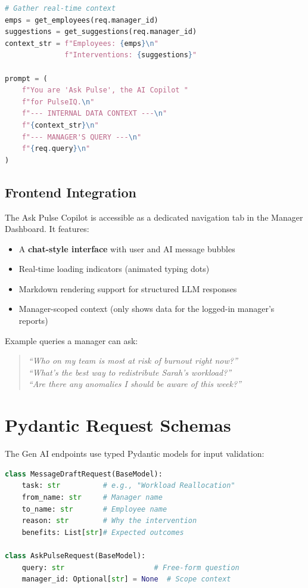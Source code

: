 \documentclass[12pt, a4paper, oneside]{report}
\begin{document}
\begin{lstlisting}[language=Python, caption={Ask Pulse RAG-style prompt}]
# Gather real-time context
emps = get_employees(req.manager_id)
suggestions = get_suggestions(req.manager_id)
context_str = f"Employees: {emps}\n"
              f"Interventions: {suggestions}"

prompt = (
    f"You are 'Ask Pulse', the AI Copilot "
    f"for PulseIQ.\n"
    f"--- INTERNAL DATA CONTEXT ---\n"
    f"{context_str}\n"
    f"--- MANAGER'S QUERY ---\n"
    f"{req.query}\n"
)
\end{lstlisting}

\subsection{Frontend Integration}

The Ask Pulse Copilot is accessible as a dedicated navigation tab in the Manager Dashboard. It features:

\begin{itemize}
    \item A \textbf{chat-style interface} with user and AI message bubbles
    \item Real-time loading indicators (animated typing dots)
    \item Markdown rendering support for structured LLM responses
    \item Manager-scoped context (only shows data for the logged-in manager's reports)
\end{itemize}

Example queries a manager can ask:
\begin{quote}
    \emph{``Who on my team is most at risk of burnout right now?''}\\
    \emph{``What's the best way to redistribute Sarah's workload?''}\\
    \emph{``Are there any anomalies I should be aware of this week?''}
\end{quote}

\section{Pydantic Request Schemas}
\label{sec:genai-schemas}

The Gen AI endpoints use typed Pydantic models for input validation:

\begin{lstlisting}[language=Python, caption={Gen AI request schemas}]
class MessageDraftRequest(BaseModel):
    task: str          # e.g., "Workload Reallocation"
    from_name: str     # Manager name
    to_name: str       # Employee name
    reason: str        # Why the intervention
    benefits: List[str]# Expected outcomes

class AskPulseRequest(BaseModel):
    query: str                     # Free-form question
    manager_id: Optional[str] = None  # Scope context
\end{lstlisting}
\end{document}
